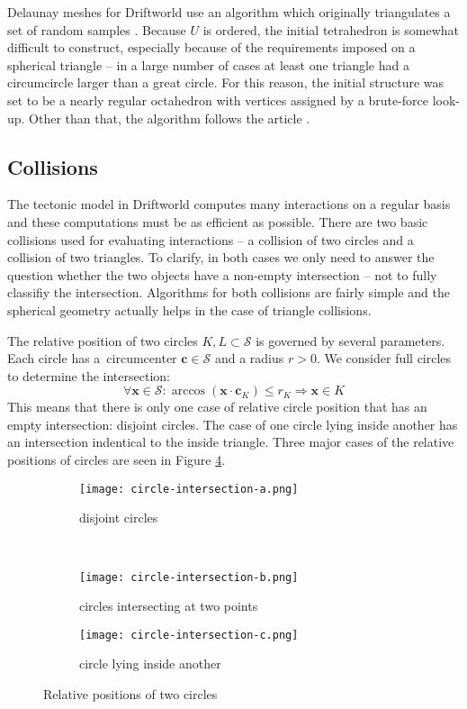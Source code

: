 Delaunay meshes for Driftworld use an algorithm which originally triangulates a set of random samples \cite{ma}. Because $U$ is ordered, the initial tetrahedron is somewhat difficult to construct, especially because of the requirements imposed on a spherical triangle -- in a large number of cases at least one triangle had a circumcircle larger than a great circle. For this reason, the initial structure was set to be a nearly regular octahedron with vertices assigned by a brute-force look-up. Other than that, the algorithm follows the article \cite{ma}.
\subsection{Collisions}
The tectonic model in Driftworld computes many interactions on a regular basis and these computations must be as efficient as possible. There are two basic collisions used for evaluating interactions -- a collision of two circles and a collision of two triangles. To clarify, in both cases we only need to answer the question whether the two objects have a non-empty intersection -- not to fully classifiy the intersection. Algorithms for both collisions are fairly simple and the spherical geometry actually helps in the case of triangle collisions.

The relative position of two circles $K,L\subset\mathcal{S}$ is governed by several parameters. Each circle has a~circumcenter $\mathbf{c} \in \mathcal{S}$ and a radius $r > 0$. We consider full circles to determine the intersection:
$$\forall\mathbf{x}\in\mathcal{S}:\arccos(\mathbf{x}\cdot\mathbf{c}_K) \le r_K\Rightarrow\mathbf{x}\in K$$
This means that there is only one case of relative circle position that has an empty intersection: disjoint circles. The case of one circle lying inside another has an intersection indentical to the inside triangle. Three major cases of the relative positions of circles are seen in Figure \ref{fig:circle-collisions}.
\begin{figure}[ht]
\centering
\begin{subfigure}{7cm}
\texttt{[image: circle-intersection-a.png]}
\caption{disjoint circles}
\label{fig:disjoint-circles}
\end{subfigure}\\
\begin{subfigure}{7cm}
\texttt{[image: circle-intersection-b.png]}
\caption{circles intersecting at two points}
\label{fig:circles-intersecting-at-two-points}
\end{subfigure}
\hspace*{1cm}
\begin{subfigure}{7cm}
\texttt{[image: circle-intersection-c.png]}
\caption{circle lying inside another}
\label{fig:circle-lying-inside-another}
\end{subfigure}
\caption{Relative positions of two circles}
\label{fig:circle-collisions}
\end{figure}

